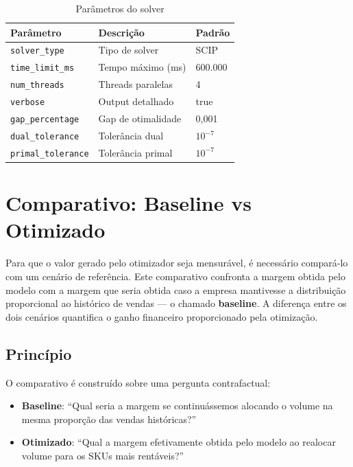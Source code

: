 \documentclass[11pt,a4paper]{article}
\begin{document}
\begin{table}[h]
\centering
\begin{tabular}{lll}
\toprule
\textbf{Parâmetro} & \textbf{Descrição} & \textbf{Padrão} \\
\midrule
\texttt{solver\_type} & Tipo de solver & SCIP \\
\texttt{time\_limit\_ms} & Tempo máximo (ms) & 600.000 \\
\texttt{num\_threads} & Threads paralelas & 4 \\
\texttt{verbose} & Output detalhado & true \\
\texttt{gap\_percentage} & Gap de otimalidade & 0,001 \\
\texttt{dual\_tolerance} & Tolerância dual & $10^{-7}$ \\
\texttt{primal\_tolerance} & Tolerância primal & $10^{-7}$ \\
\bottomrule
\end{tabular}
\caption{Parâmetros do solver}
\label{tab:solver}
\end{table}

\section{Comparativo: Baseline vs Otimizado}

Para que o valor gerado pelo otimizador seja mensurável, é necessário
compará-lo com um cenário de referência. Este comparativo confronta a margem
obtida pelo modelo com a margem que seria obtida caso a empresa mantivesse a
distribuição proporcional ao histórico de vendas --- o chamado
\textbf{baseline}. A diferença entre os dois cenários quantifica o ganho
financeiro proporcionado pela otimização.

\subsection{Princípio}

O comparativo é construído sobre uma pergunta contrafactual:

\begin{itemize}
    \item \textbf{Baseline}: ``Qual seria a margem se continuássemos alocando
        o volume na mesma proporção das vendas históricas?''
    \item \textbf{Otimizado}: ``Qual a margem efetivamente obtida pelo modelo
        ao realocar volume para os SKUs mais rentáveis?''
\end{itemize}
\end{document}
